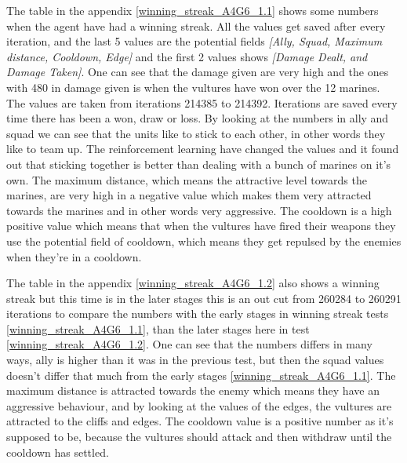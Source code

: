 

The table in the appendix \ref{winning_streak_A4G6_1.1} shows some numbers when the agent have had a winning streak. All the values get saved after every iteration, and the last 5 values are the potential fields \textit{[Ally, Squad, Maximum distance, Cooldown, Edge]} and the first 2 values shows \textit{[Damage Dealt, and Damage Taken]}. One can see that the damage given are very high and the ones with 480 in damage given is when the vultures have won over the 12 marines. The values are taken from iterations 214385 to 214392. Iterations are saved every time there has been a won, draw or loss. By looking at the numbers in ally and squad we can see that the units like to stick to each other, in other words they like to team up. The reinforcement learning have changed the values and it found out that sticking together is better than dealing with a bunch of marines on it's own. The maximum distance, which means the attractive level towards the marines, are very high in a negative value which makes them very attracted towards the marines and in other words very aggressive. The cooldown is a high positive value which means that when the vultures have fired their weapons they use the potential field of cooldown, which means they get repulsed by the enemies when they're in a cooldown. 






The table in the appendix \ref{winning_streak_A4G6_1.2} also shows a winning streak but this time is in the later stages this is an out cut from 260284 to 260291 iterations to compare the numbers with the early stages in winning streak tests \ref{winning_streak_A4G6_1.1}, than the later stages here in test \ref{winning_streak_A4G6_1.2}. One can see that the numbers differs in many ways, ally is higher than it was in the previous test, but then the squad values doesn't differ that much from the early stages \ref{winning_streak_A4G6_1.1}. The maximum distance is attracted towards the enemy which means they have an aggressive behaviour, and by looking at the values of the edges, the vultures are attracted to the cliffs and edges. The cooldown value is a positive number as it's supposed to be, because the vultures should attack and then withdraw until the cooldown has settled.

